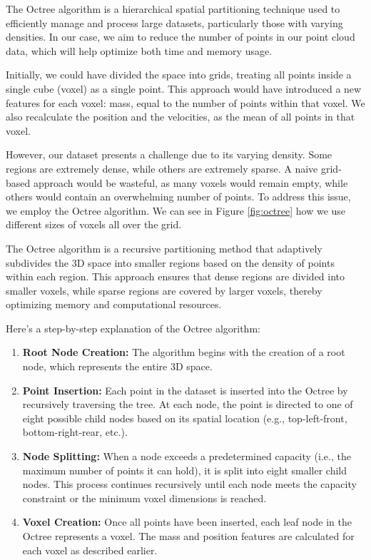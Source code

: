     The Octree algorithm is a hierarchical spatial partitioning technique used to efficiently manage and process large datasets, particularly those with varying densities. In our case, we aim to reduce the number of points in our point cloud data, which will help optimize both time and memory usage.
    
    Initially, we could have divided the space into grids, treating all points inside a single cube (voxel) as a single point. This approach would have introduced a new features for each voxel: mass, equal to the number of points within that voxel. We also recalculate the position and the velocities, as the mean of all points in that voxel.
    
    However, our dataset presents a challenge due to its varying density. Some regions are extremely dense, while others are extremely sparse. A naive grid-based approach would be wasteful, as many voxels would remain empty, while others would contain an overwhelming number of points. To address this issue, we employ the Octree algorithm. We can see in Figure \ref{fig:octree} how we use different sizes of voxels all over the grid.
    
    The Octree algorithm is a recursive partitioning method that adaptively subdivides the 3D space into smaller regions based on the density of points within each region. This approach ensures that dense regions are divided into smaller voxels, while sparse regions are covered by larger voxels, thereby optimizing memory and computational resources.
    
    Here's a step-by-step explanation of the Octree algorithm:
    
    \begin{enumerate}
        \item \textbf{Root Node Creation:} The algorithm begins with the creation of a root node, which represents the entire 3D space.
        \item \textbf{Point Insertion:} Each point in the dataset is inserted into the Octree by recursively traversing the tree. At each node, the point is directed to one of eight possible child nodes based on its spatial location (e.g., top-left-front, bottom-right-rear, etc.).
        \item \textbf{Node Splitting:} When a node exceeds a predetermined capacity (i.e., the maximum number of points it can hold), it is split into eight smaller child nodes. This process continues recursively until each node meets the capacity constraint or the minimum voxel dimensions is reached.
        \item \textbf{Voxel Creation:} Once all points have been inserted, each leaf node in the Octree represents a voxel. The mass and position features are calculated for each voxel as described earlier.
    \end{enumerate}

